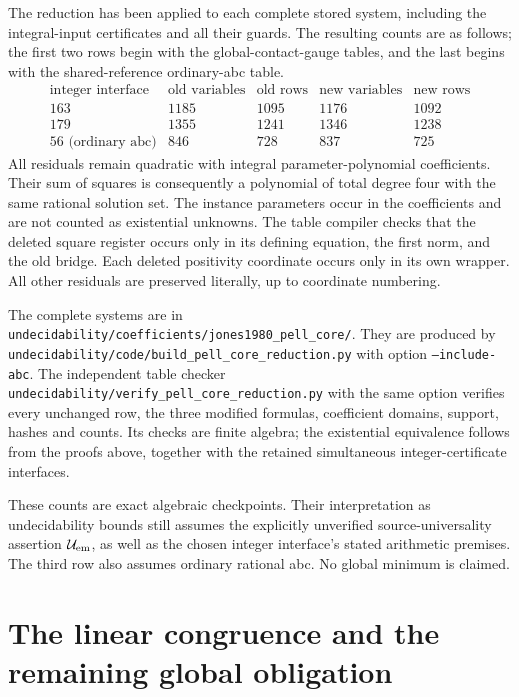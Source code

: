 \documentclass[11pt]{article}
\begin{document}
The reduction has been applied to each complete stored system, including
the integral-input certificates and all their guards.  The resulting counts
are as follows; the first two rows begin with the global-contact-gauge
tables, and the last begins with the shared-reference ordinary-abc table.
\[
\begin{array}{c|rr|rr}
\text{integer interface}&\text{old variables}&\text{old rows}
 &\text{new variables}&\text{new rows}\\\hline
163&1185&1095&1176&1092\\
179&1355&1241&1346&1238\\
56\text{ (ordinary abc)}&846&728&837&725
\end{array}
\]
All residuals remain quadratic with integral parameter-polynomial
coefficients.  Their sum of squares is consequently a polynomial of total
degree four with the same rational solution set.  The instance parameters
occur in the coefficients and are not counted as existential unknowns.
The table compiler checks that the deleted square register occurs only in
its defining equation, the first norm, and the old bridge.  Each deleted
positivity coordinate occurs only in its own wrapper.  All other residuals
are preserved literally, up to coordinate numbering.

The complete systems are in
\nolinkurl{undecidability/coefficients/jones1980_pell_core/}.
They are produced by
\nolinkurl{undecidability/code/build_pell_core_reduction.py}
with option \texttt{--include-abc}.  The independent table checker
\nolinkurl{undecidability/verify_pell_core_reduction.py}
with the same option verifies every unchanged row, the three modified
formulas, coefficient domains, support, hashes and counts.  Its checks
are finite algebra; the existential equivalence follows from the proofs
above, together with the retained simultaneous integer-certificate
interfaces.

These counts are exact algebraic checkpoints.  Their interpretation as
undecidability bounds still assumes the explicitly unverified
source-universality assertion \(\mathcal U_{\rm em}\), as well as the
chosen integer interface's stated arithmetic premises.  The third row
also assumes ordinary rational abc.  No global minimum is claimed.

\section{The linear congruence and the remaining global obligation}
\end{document}

